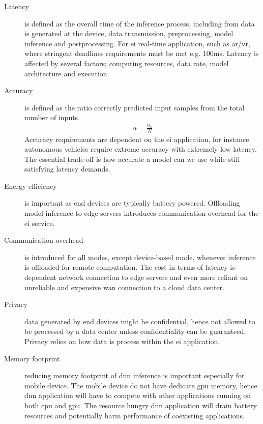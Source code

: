 \begin{description}
	\item[Latency] is defined as the overall time of the inference process, including from data is generated at the device, data transmission, preprocessing, model inference and postprocessing. For \gls{ei} real-time application, such as \gls{ar}/\gls{vr}, where stringent deadlines requirements must be met e.g. 100ms. Latency is affected by several factors; computing resources, data rate, model architecture and execution.
	
	\item[Accuracy] is defined as the ratio correctly predicted input samples from the total number of inputs. 
	\begin{align*}
		\alpha = \frac{n_c}{N}
	\end{align*}
	Accuracy requirements are dependent on the \gls{ei} application, for instance autonomous vehicles require extreme accuracy with extremely low latency. The essential trade-off is how accurate a model can we use while still satisfying latency demands.  
	
	\item[Energy efficiency] is important as end devices are typically battery powered. Offloading model inference to edge servers introduces communication overhead for the \gls{ei} service.
	
	\item[Communication overhead] is introduced for all modes, except device-based mode, whenever inference is offloaded for remote computation. The cost in terms of latency is dependent network connection to edge servers and even more reliant on unreliable and expensive \gls{wan} connection to a cloud data center.
	 
	\item[Privacy] data generated by end devices might be confidential, hence not allowed to be processed by a data center unless confidentiality can be guaranteed. Privacy relies on how data is process within the \gls{ei} application.  
	
	\item[Memory footprint] reducing memory footprint of \gls{dnn} inference is important especially for mobile device. The mobile device do not have dedicate \gls{gpu} memory, hence \gls{dnn} application will have to compete with other applications running on both \gls{cpu} and \gls{gpu}. The resource hungry \gls{dnn} application will drain battery resources and potentially harm performance of coexisting applications.   
\end{description}

